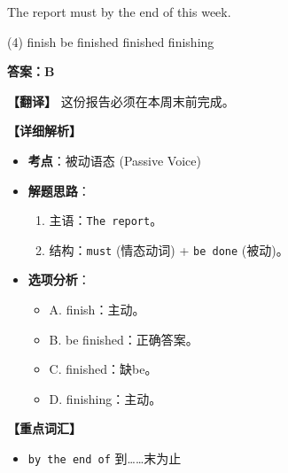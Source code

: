 \documentclass[11pt, a4paper]{article}
\newcommand{\analysis}[4]{
    \begin{solutionbox}
        \textbf{答案：#1}
        
        \textbf{【翻译】} #2
        
        \textbf{【详细解析】}
        #3
        
        \textbf{【重点词汇】}
        #4
    \end{solutionbox}
}
\newcommand{\blank}{\underline{\hspace{1.5cm}}}
\begin{document}
\begin{questions}
    \item The report must \blank by the end of this week.
    \begin{tasks}(4)
        \task finish \task be finished \task finished \task finishing
    \end{tasks}
    \analysis{B}{这份报告必须在本周末前完成。}{
        \begin{itemize}
            \item \textbf{考点}：被动语态 (Passive Voice)
            \item \textbf{解题思路}：
                \begin{enumerate}
                    \item 主语：\texttt{The report}。
                    \item 结构：\texttt{must} (情态动词) + \texttt{be done} (被动)。
                \end{enumerate}
            \item \textbf{选项分析}：
                \begin{itemize}
                    \item A. finish：主动。
                    \item B. be finished：正确答案。
                    \item C. finished：缺be。
                    \item D. finishing：主动。
                \end{itemize}
        \end{itemize}
    }{
        \begin{itemize}
            \item \texttt{by the end of} 到……末为止
        \end{itemize}
    }


\end{questions}
\end{document}
